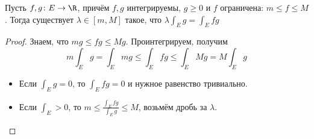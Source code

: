 
\begin{theorem}
	Пусть $f, g \colon E \to \R$, причём $f, g$ интегрируемы, $g \ge 0$
	и $f$ ограничена: $m \le f \le M$.
	Тогда существует $\lambda \in [m, M]$ такое, что $\lambda \int_E g = \int_E fg$
\end{theorem}
\begin{proof}
	Знаем, что $mg \le fg \le Mg$.
	Проинтегрируем, получим
	\[
	m \int_E g = \int_E mg \le \int_E fg \le \int_E Mg = M \int_E g
	\]
	\begin{itemize}
	\item
		Если $\int_E g=0$, то $\int_E fg = 0$ и нужное равенство тривиально.
	\item
		Если $\int_E > 0$, то $m \le \frac{\int_E fg}{\int_E g} \le M$, возьмём дробь за $\lambda$.
	\end{itemize}
\end{proof}

